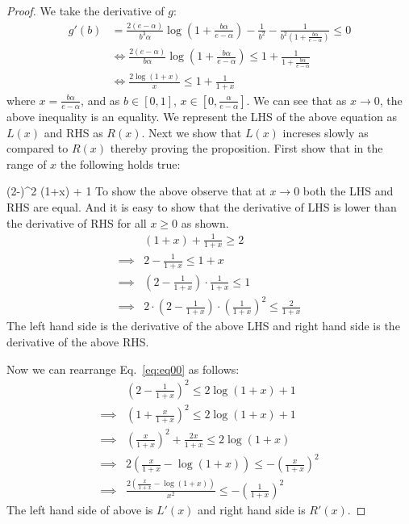 \begin{proof}
We take the derivative of $g$:
\begin{align*}
g'(b) &= \frac{2(e-\alpha)}{b^3 \alpha} \log\left(1+\frac{b\alpha}{e-\alpha} \right) - \frac{1}{b^2}-\frac{1}{b^2\left(1+\frac{b\alpha}{e-\alpha}\right)} \leq 0 \\
&\iff \frac{2(e-\alpha)}{b \alpha} \log\left(1+\frac{b\alpha}{e-\alpha} \right) \leq 1+\frac{1}{1+\frac{b\alpha}{e-\alpha}} \\
&\iff \frac{2\log(1+x)}{x} \leq 1+\frac{1}{1+x}
\end{align*}
where $x = \frac{b\alpha}{e-\alpha}$, and as $b \in [0,1]$, $x \in [0, \frac{\alpha}{e-\alpha}]$. We can see that as $x \rightarrow 0$, the above inequality is an equality. 
We represent the LHS of the above equation as $L(x)$ and RHS as $R(x)$. Next we show that $L(x)$ increses slowly as compared to $R(x)$ thereby proving the proposition.
First show that in the range of $x$ the following holds true:

\beq
\label{eq:eq00}
\left(2-\right)^2 \log(1+x) + 1
\eeq
To show the above observe that at $x\rightarrow 0$ both the LHS and RHS are equal. And it is easy to show that the derivative of LHS is lower than the derivative of RHS for all $x\ge 0$ as shown.
\begin{align*}
& (1+x) + \frac{1}{1+x} \ge 2\\
\implies & 2 - \frac{1}{1+x} \le 1 + x\\
\implies & (2-\frac{1}{1+x})\cdot \frac{1}{1+x} \le 1\\
\implies & 2\cdot(2-\frac{1}{1+x})\cdot (\frac{1}{1+x})^2 \le \frac{2}{1+x}
\end{align*}
The left hand side is the derivative of the above LHS and right hand side is the derivative of the above RHS.

Now we can rearrange Eq.~\ref{eq:eq00} as follows:
\begin{align*}
& \left(2-\frac{1}{1+x}\right)^2 \le 2\log(1+x) + 1\\
\implies & (1 + \frac{x}{1+x})^2 \le 2\log(1+x) + 1\\
\implies & (\frac{x}{1+x})^2 + \frac{2x}{1+x} \le 2\log(1+x)\\
\implies & 2\left(\frac{x}{1+x} - \log(1+x)\right) \le - (\frac{x}{1+x})^2\\
\implies & \frac{2\left(\frac{x}{1+x} - \log(1+x)\right)}{x^2} \le - (\frac{1}{1+x})^2
\end{align*}
The left hand side of above is $L'(x)$ and right hand side is $R'(x)$.

\end{proof}

